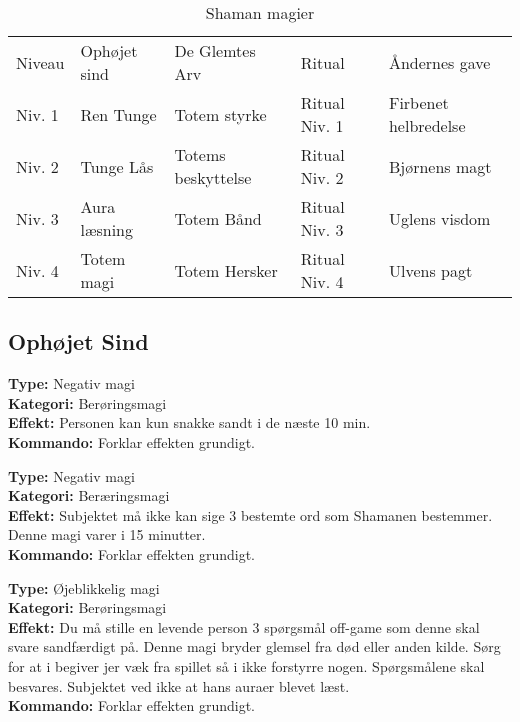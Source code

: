 \begin{table}[H]
    \centering
    \begin{tabular}{|p{}|p{}|p{}|p{}|p{}|}
    \hline
    \rowcolor{cerulean!80}
    \multicolumn{5}{c}{Shaman magi}\\
    \hline
    \rowcolor{cerulean!40}
         Niveau & Ophøjet sind & De Glemtes Arv & Ritual & Åndernes gave \\\hline
         
        Niv. 1 & Ren Tunge & Totem styrke & Ritual Niv. 1 & Firbenet helbredelse\\\hline

        Niv. 2 & Tunge Lås & Totems beskyttelse & Ritual Niv. 2 & Bjørnens magt\\\hline
    
         Niv. 3 & Aura læsning & Totem Bånd & Ritual Niv. 3 & Uglens visdom\\\hline
         
         Niv. 4 & Totem magi & Totem Hersker & Ritual Niv. 4 & Ulvens pagt\\\hline
         \end{tabular}
         \caption{Shaman magier}
\end{table}

\subsection{Ophøjet Sind}
\begin{meditation*}
\textbf{Type:} Negativ magi\\
\textbf{Kategori:} Berøringsmagi\\
\textbf{Effekt:} Personen kan kun snakke sandt i de næste 10 min.\\
\textbf{Kommando:} Forklar effekten grundigt.
\end{meditation*}

\begin{meditation*}
\textbf{Type:} Negativ magi\\
\textbf{Kategori:} Beræringsmagi\\
\textbf{Effekt:} Subjektet må ikke kan sige 3 bestemte ord som Shamanen bestemmer. Denne magi varer i 15 minutter.\\
\textbf{Kommando:} Forklar effekten grundigt.
\end{meditation*}

\begin{meditation*}
\textbf{Type:} Øjeblikkelig magi\\
\textbf{Kategori:} Berøringsmagi\\
\textbf{Effekt:} Du må stille en levende person 3 spørgsmål off-game som denne skal svare sandfærdigt på. Denne magi bryder glemsel fra død eller anden kilde. Sørg for at i begiver jer væk fra spillet så i ikke forstyrre nogen. Spørgsmålene skal besvares. Subjektet ved ikke at hans auraer blevet læst.\\
\textbf{Kommando:} Forklar effekten grundigt.
\end{meditation*}

